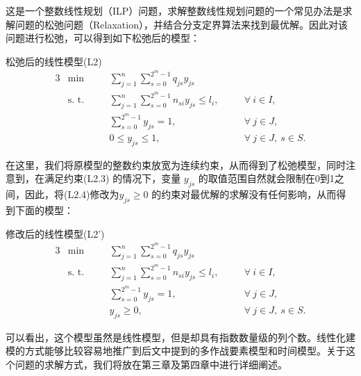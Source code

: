这是一个整数线性规划（ILP）问题，求解整数线性规划问题的一个常见办法是求解问题的松弛问题（Relaxation），并结合分支定界算法来找到最优解。因此对该问题进行松弛，可以得到如下松弛后的模型：

松弛后的线性模型(L2)
\begin{alignat}{3}
	&\min\quad && \sum_{j=1}^n \sum_{s=0}^{2^m -1} q_{js}y_{js} \tag{L2.1} \\ 
	&\text{s. t.}\quad &&\sum_{j=1}^n \sum_{s=0}^{2^m -1} n_{si}y_{js} \leq l_i, \quad && \forall ~ i \in I, \tag{L2.2}\\
	& && \sum_{s=0}^{2^m -1} y_{js} = 1, \quad && \forall ~ j \in J, \tag{L2.3}\\
	& && 0 \leq y_{js} \leq 1, \quad && \forall ~ j \in J, ~ s \in S. \tag{L2.4}
\end{alignat}

在这里，我们将原模型的整数约束放宽为连续约束，从而得到了松弛模型，同时注意到，在满足约束(L2.3) 的情况下，变量 $y_{js}$ 的取值范围自然就会限制在0到1之间，因此，将(L2.4)修改为$y_{js} \geq 0$ 的约束对最优解的求解没有任何影响，从而得到下面的模型：

修改后的线性模型(L2')
\begin{alignat}{3}
	&\min\quad && \sum_{j=1}^n \sum_{s=0}^{2^m -1} q_{js}y_{js} \tag{L2'.1} \\ 
	&\text{s. t.}\quad &&\sum_{j=1}^n \sum_{s=0}^{2^m -1} n_{si}y_{js} \leq l_i, \quad && \forall ~ i \in I, \tag{L2'.2}\\
	& && \sum_{s=0}^{2^m -1} y_{js} = 1, \quad && \forall ~ j \in J, \tag{L2'.3}\\
	& && y_{js} \geq 0, \quad && \forall ~ j \in J, ~ s \in S. \tag{L2'.4}
\end{alignat}


可以看出，这个模型虽然是线性模型，但是却具有指数数量级的列个数。线性化建模的方式能够比较容易地推广到后文中提到的多作战要素模型和时间模型。关于这个问题的求解方式，我们将放在第三章及第四章中进行详细阐述。

